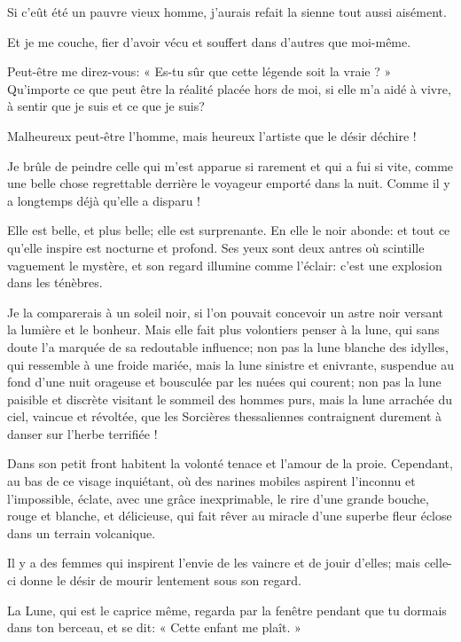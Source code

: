 Si c’eût été un pauvre vieux homme,
j’aurais refait la sienne tout aussi aisément.

Et je me couche, fier d’avoir vécu et souffert dans
d’autres que moi{}-même.

Peut{}-être me direz{}-vous: « Es{}-tu sûr que cette légende soit la
vraie ? » Qu’importe ce que peut être la réalité
placée hors de moi, si elle m’a aidé à vivre, à sentir
que je suis et ce que je suis?


Malheureux peut{}-être l’homme, mais heureux
l’artiste que le désir déchire !

Je brûle de peindre celle qui m’est apparue si rarement
et qui a fui si vite, comme une belle chose regrettable derrière le
voyageur emporté dans la nuit. Comme il y a longtemps déjà
qu’elle a disparu !

Elle est belle, et plus belle; elle est surprenante. En elle le noir
abonde: et tout ce qu’elle inspire est nocturne et
profond. Ses yeux sont deux antres où scintille vaguement le mystère,
et son regard illumine comme l’éclair:
c’est une explosion dans les ténèbres.

Je la comparerais à un soleil noir, si l’on pouvait
concevoir un astre noir versant la lumière et le bonheur. Mais elle
fait plus volontiers penser à la lune, qui sans doute
l’a marquée de sa redoutable influence; non pas la
lune blanche des idylles, qui ressemble à une froide mariée, mais la
lune sinistre et enivrante, suspendue au fond d’une
nuit orageuse et bousculée par les nuées qui courent; non pas la lune
paisible et discrète visitant le sommeil des hommes purs, mais la lune
arrachée du ciel, vaincue et révoltée, que les Sorcières thessaliennes
contraignent durement à danser sur l’herbe terrifiée !

Dans son petit front habitent la volonté tenace et
l’amour de la proie. Cependant, au bas de ce visage
inquiétant, où des narines mobiles aspirent l’inconnu
et l’impossible, éclate, avec une grâce inexprimable,
le rire d’une grande bouche, rouge et blanche, et
délicieuse, qui fait rêver au miracle d’une superbe
fleur éclose dans un terrain volcanique.

Il y a des femmes qui inspirent l’envie de les vaincre
et de jouir d’elles; mais celle{}-ci donne le désir de
mourir lentement sous son regard.



La Lune, qui est le caprice même, regarda par la fenêtre pendant que tu
dormais dans ton berceau, et se dit: « Cette enfant me plaît. »

